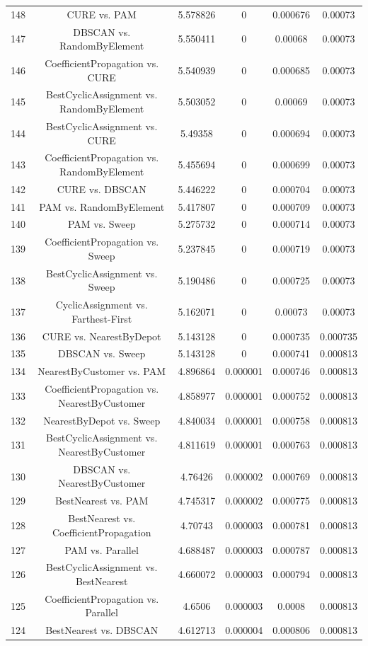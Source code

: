 \documentclass[a4paper,10pt]{article}
\begin{document}
\begin{landscape}
\begin{table}[!htp]
\begin{tabular}{cccccc}
148&CURE vs. PAM&5.578826&0&0.000676&0.00073\\
147&DBSCAN vs. RandomByElement&5.550411&0&0.00068&0.00073\\
146&CoefficientPropagation vs. CURE&5.540939&0&0.000685&0.00073\\
145&BestCyclicAssignment vs. RandomByElement&5.503052&0&0.00069&0.00073\\
144&BestCyclicAssignment vs. CURE&5.49358&0&0.000694&0.00073\\
143&CoefficientPropagation vs. RandomByElement&5.455694&0&0.000699&0.00073\\
142&CURE vs. DBSCAN&5.446222&0&0.000704&0.00073\\
141&PAM vs. RandomByElement&5.417807&0&0.000709&0.00073\\
140&PAM vs. Sweep&5.275732&0&0.000714&0.00073\\
139&CoefficientPropagation vs. Sweep&5.237845&0&0.000719&0.00073\\
138&BestCyclicAssignment vs. Sweep&5.190486&0&0.000725&0.00073\\
137&CyclicAssignment vs. Farthest-First&5.162071&0&0.00073&0.00073\\
136&CURE vs. NearestByDepot&5.143128&0&0.000735&0.000735\\
135&DBSCAN vs. Sweep&5.143128&0&0.000741&0.000813\\
134&NearestByCustomer vs. PAM&4.896864&0.000001&0.000746&0.000813\\
133&CoefficientPropagation vs. NearestByCustomer&4.858977&0.000001&0.000752&0.000813\\
132&NearestByDepot vs. Sweep&4.840034&0.000001&0.000758&0.000813\\
131&BestCyclicAssignment vs. NearestByCustomer&4.811619&0.000001&0.000763&0.000813\\
130&DBSCAN vs. NearestByCustomer&4.76426&0.000002&0.000769&0.000813\\
129&BestNearest vs. PAM&4.745317&0.000002&0.000775&0.000813\\
128&BestNearest vs. CoefficientPropagation&4.70743&0.000003&0.000781&0.000813\\
127&PAM vs. Parallel&4.688487&0.000003&0.000787&0.000813\\
126&BestCyclicAssignment vs. BestNearest&4.660072&0.000003&0.000794&0.000813\\
125&CoefficientPropagation vs. Parallel&4.6506&0.000003&0.0008&0.000813\\
124&BestNearest vs. DBSCAN&4.612713&0.000004&0.000806&0.000813\\

\end{tabular}
\end{table}
\end{landscape}
\end{document}
